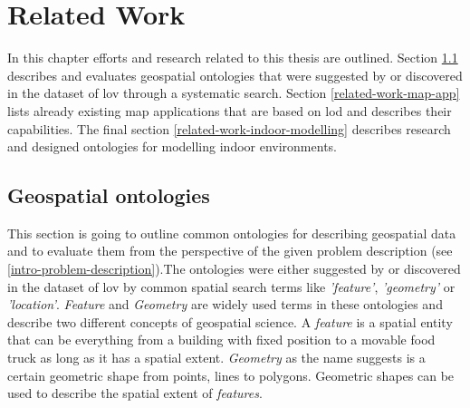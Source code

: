 \documentclass[draft,final]{vutinfth} %
\newcommand{\todo}[1]{{\color{red}\textbf{TODO: {#1}}}} %
\begin{document}




\chapter{Related Work}
\label{related-work-chapter}

In this chapter efforts and research related to this thesis are outlined. Section \ref{related-work-geospatial-ontologies} describes and evaluates geospatial ontologies that were suggested by \cite{tandy_spatial_2016} or discovered in the dataset of \gls{lov} through a systematic search. Section \ref{related-work-map-app} lists already existing map applications that are based on \gls{lod} and describes their capabilities. The final section \ref{related-work-indoor-modelling} describes research and designed ontologies for modelling indoor environments.

\section{Geospatial ontologies}
\label{related-work-geospatial-ontologies}
This section is going to outline common ontologies for describing geospatial data and to evaluate them from the perspective of the given problem description (see \ref{intro-problem-description}).The ontologies were either suggested by \cite{tandy_spatial_2016} or discovered in the dataset of \gls{lov} by common spatial search terms like \textit{'feature'}, \textit{'geometry'} or \textit{'location'}. \textit{Feature} and \textit{Geometry} are widely used terms in these ontologies and describe two different concepts of geospatial science. A \textit{feature}  is a spatial entity that can be everything from a building with fixed position to a movable food truck as long as it has a spatial extent. \textit{Geometry} as the name suggests is a certain geometric shape from points, lines to polygons. Geometric shapes can be used to describe  the spatial extent of \textit{features}.
\end{document}
